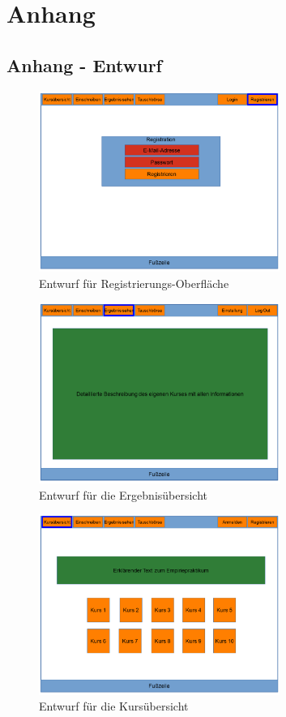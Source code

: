 \clearpage
\chapter{Anhang}
\label{chapter:appendix}
    \section{Anhang - Entwurf}
        \begin{figure}[t]
            \centering
            \includegraphics[width=0.7\textwidth]{./design/images/MockUpsFrontend/frontendRegistration.png}
            \caption{Entwurf für Registrierungs-Oberfläche}
            \label{mockupRegistrationFrontend}
        \end{figure}
    
        \begin{figure}[t]
            \centering
            \includegraphics[width=0.7\textwidth]{./design/images/MockUpsFrontend/frontendResults.png}
            \caption{Entwurf für die Ergebnisübersicht}
            \label{mockupResultsFrontend}
        \end{figure}
    
        \begin{figure}[t]
            \centering
            \includegraphics[width=0.7\textwidth]{./design/images/MockUpsFrontend/frontendCourses.png}
            \caption{Entwurf für die Kursübersicht}
            \label{mockupCoursesFrontend}
        \end{figure}